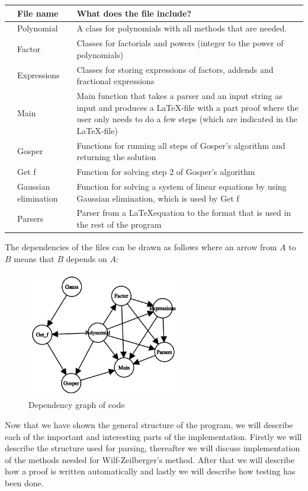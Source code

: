 \begin{center}
  \begin{tabular}{C{1mm}C{3cm}|C{8cm}}
    &\textbf{File name}   & \textbf{What does the file include?} \\ \hline
    &Polynomial  & A class for polynomials with all methods that are needed. \\ \hline
    &Factor      & Classes for factorials and powers (integer to the power of polynomials) \\ \hline
    &Expressions & Classes for storing expressions of factors, addends and fractional expressions \\ \hline
    &Main        & Main function that takes a parser and an input string as input and produces a \LaTeX-file with a part proof where the user only needs to do a few steps (which are indicated in the \LaTeX-file) \\ \hline
    &Gosper      & Functions for running all steps of Gosper's algorithm and returning the solution \\ \hline
    &Get f       & Function for solving step 2 of Gosper's algorithm \\ \hline
    &Gaussian elimination & Function for solving a system of linear equations by using Gaussian elimination, which is used by Get f \\ \hline
    &Parsers     & Parser from a \LaTeX equation to the format that is used in the rest of the program \\
  \end{tabular}
\end{center}

The dependencies of the files can be drawn as follows where an arrow from $A$ to $B$ means that $B$ depends on $A$:
\begin{figure}[H]
\centering
\includegraphics[width=0.6\textwidth]{images/dependency_graph.png}
\caption{Dependency graph of code}\label{Fig: DepGraph}
\end{figure}
Now that we have shown the general structure of the program, we will describe each of the important and interesting parts of the implementation. Firstly we will describe the structure used for parsing, thereafter we will discuss implementation of the methods needed for Wilf-Zeilberger's method. After that we will describe how a proof is written automatically and lastly we will describe how testing has been done.

